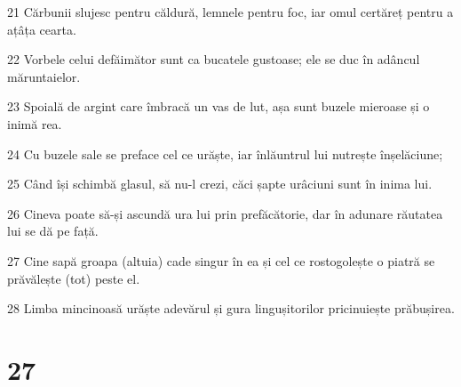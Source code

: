 \par 21 Cărbunii slujesc pentru căldură, lemnele pentru foc, iar omul certăreț pentru a ațâța cearta.
\par 22 Vorbele celui defăimător sunt ca bucatele gustoase; ele se duc în adâncul măruntaielor.
\par 23 Spoială de argint care îmbracă un vas de lut, așa sunt buzele mieroase și o inimă rea.
\par 24 Cu buzele sale se preface cel ce urăște, iar înlăuntrul lui nutrește înșelăciune;
\par 25 Când își schimbă glasul, să nu-l crezi, căci șapte urâciuni sunt în inima lui.
\par 26 Cineva poate să-și ascundă ura lui prin prefăcătorie, dar în adunare răutatea lui se dă pe față.
\par 27 Cine sapă groapa (altuia) cade singur în ea și cel ce rostogolește o piatră se prăvălește (tot) peste el.
\par 28 Limba mincinoasă urăște adevărul și gura lingușitorilor pricinuiește prăbușirea.

\chapter{27}

